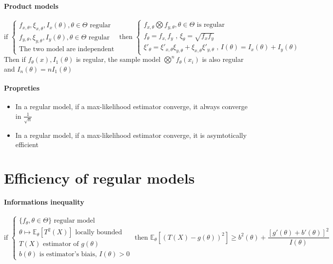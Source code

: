 \documentclass[a4paper,10pt]{article}
\begin{document}
\paragraph{Product models}
\[
\text{if }
\left\{
\begin{array}{l}
f_{x,\theta}, \xi_{x,\theta} , I_{x}(\theta) , \theta \in \Theta \text{ regular} \\
f_{y,\theta}, \xi_{y,\theta} , I_{y}(\theta) , \theta \in \Theta \text{ regular} \\
\text{The two model are independent}
\end{array}\right.
\text{ then }
\left\{
\begin{array}{l}
f_{x,\theta} \bigotimes f_{y,\theta}, \theta \in \Theta \text{ is regular}\\
f_{\theta} = f_{x,} f_{y} \text{ , } \xi_{\theta} = \sqrt{f_{x} f_{y}}\\
\xi'_{\theta} = \xi'_{x,\theta}\xi_{y,\theta} + \xi_{x,\theta}\xi'_{y,\theta} \text{ , } I(\theta)=I_x(\theta)+I_y(\theta) 
\end{array}\right.
\]
Then if {$ f_{\theta}(x) ,I_1(\theta) $} is regular, the sample model $ \bigotimes^n f_{\theta}(x_i)$ is also regular and $I_n(\theta) = n I_1(\theta)$
\paragraph{Propreties}
\begin{itemize}
 \item In a regular model, if a max-likelihood estimator converge, it always converge in $\frac{1}{\sqrt{n}}$
 \item In a regular model, if a max-likelihood estimator converge, it is asymtotically efficient
\end{itemize}



\section{Efficiency of regular models}
\paragraph{Informations inequality}
\[
\text{if }
\left\{
\begin{array}{l}
\{f_{\theta}, \theta \in \Theta\} \text{ regular model} \\
\theta \mapsto \mathbb{E}_{\theta}[T^2(X)] \text{ locally bounded} \\
T(X) \text{ estimator of } g(\theta) \\
b(\theta) \text{ is estimator's biais, }I(\theta) > 0
\end{array}\right.
\text{ then }
\mathbb{E}_{\theta}[(T(X)-g(\theta))^2] \geq 
b^2(\theta) + \frac{[g'(\theta)+b'(\theta)]^2}{I(\theta)}
\]
\end{document}
